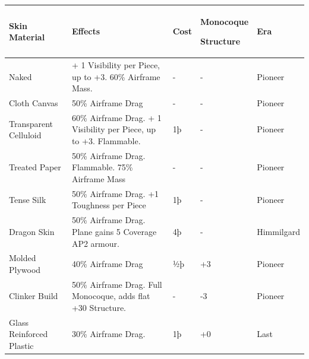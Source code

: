 \documentclass{article}
\begin{document}
\begin{tabular}{|l|l|l|l|l|}
    \hline
    Skin Material                & Effects                                                 & Cost       & Monocoque

    Structure                    & Era                                                                                          \\\hline
    Naked                        & + 1 Visibility per Piece, up to +3. 60\% Airframe Mass. & -          & -
                                 & Pioneer                                                                                      \\\hline
    Cloth Canvas                 & 50\% Airframe Drag                                      & -          & -           & Pioneer \\\hline
    Transparent Celluloid        & {60\% Airframe Drag. + 1 Visibility per
    Piece, up to +3. Flammable.} & {1þ}                                                    & {-}        &
    {Pioneer}                                                                                                                   \\\hline
    Treated Paper                & 50\% Airframe Drag. Flammable. 75\% Airframe Mass       & -          &
    -                            & Pioneer                                                                                      \\\hline
    Tense Silk                   & 50\% Airframe Drag. +1 Toughness per Piece              & 1þ         & -           &
    Pioneer                                                                                                                     \\\hline
    Dragon Skin                  & 50\% Airframe Drag. Plane gains 5 Coverage AP2 armour.  &
    4þ                           & -                                                       & Himmilgard                         \\\hline
    Molded Plywood               & 40\% Airframe Drag                                      & ½þ         & +3          & Pioneer \\\hline
    Clinker Build                & 50\% Airframe Drag. Full Monocoque, adds flat +30
    Structure.                   & -                                                       & -3         & Pioneer               \\\hline
    Glass Reinforced Plastic     & 30\% Airframe Drag.                                     & 1þ         & +0          & Last

\end{tabular}
\end{document}
